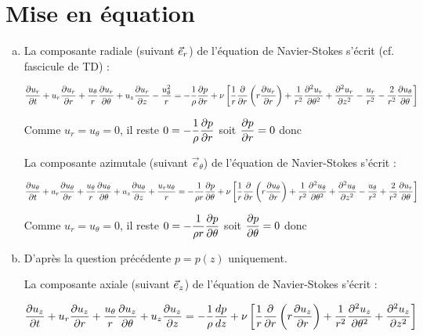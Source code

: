 \documentclass[10pt, a4paper]{article}
\renewcommand{\myvec}[1]{\vec{#1}}
\begin{document}
\section{Mise en équation}

\begin{myenumerate}
\item
\begin{enumerate}[a)]
\item 
La composante radiale (suivant $\er$) de l'équation de Navier-Stokes s'écrit (cf. fascicule de TD) :

\medskip %
$
\dpdt{u_r}
+ 
u_r \dpdr{u_r} + \dfrac{u_{\theta}}{r} \dpdtheta{u_r} + u_z \dpdz{u_r} - \dfrac{u_{\theta}^2}{r} 
=
- \dfrac{1}{\rho} \dpdr{p}
+ \nu \left[ \dfrac{1}{r} \dpdr{} \left( r \dpdr{u_r} \right) + 
             \dfrac{1}{r^2} \ddpdtheta{u_r} + \ddpdz{u_r} -
             \dfrac{u_r}{r^2} - \dfrac{2}{r^2} \dpdtheta{u_{\theta}} \right]
$

\medskip
Comme $u_r = u_\theta = 0$, il reste $0 = - \dfrac{1}{\rho} \dpdr{p}$ soit $\dpdr{p} = 0$ donc
\dotfill
{}

\medskip
La composante azimutale (suivant $\myvec{e}_\theta$) de l'équation de Navier-Stokes s'écrit :

\medskip %
$
\dpdt{u_\theta}
+ 
u_r \dpdr{u_\theta} + \dfrac{u_{\theta}}{r} \dpdtheta{u_\theta} + u_z \dpdz{u_\theta} + \dfrac{u_ru_{\theta}}{r} 
=
- \dfrac{1}{\rho r} \dpdtheta{p}
+ \nu \left[ \dfrac{1}{r} \dpdr{} \left( r \dpdr{u_\theta} \right) + 
             \dfrac{1}{r^2} \ddpdtheta{u_\theta} + \ddpdz{u_\theta} -
             \dfrac{u_\theta}{r^2} + \dfrac{2}{r^2} \dpdtheta{u_r} \right]
$

\medskip
Comme $u_r = u_\theta = 0$, il reste $0 = - \dfrac{1}{\rho r} \dpdtheta{p}$ soit $\dpdtheta{p} = 0$ donc
\dotfill
{}

\item
D'après la question précédente $p=p(z)$ uniquement.

La composante axiale (suivant $\ez$) de l'équation de Navier-Stokes s'écrit :

\medskip
$
\dpdt{u_z} + u_r \dpdr{u_z} + \dfrac{u_{\theta}}{r} \dpdtheta{u_z} + u_z \dpdz{u_z} =
- \dfrac{1}{\rho} \ddz{p}
+ \nu \left[ \frac{1}{r} \dpdr{} \left( r \dpdr{u_z} \right) + 
             \dfrac{1}{r^2} \ddpdtheta{u_z} + \ddpdz{u_z} \right]
$


\end{enumerate}
\end{myenumerate}
\end{document}

